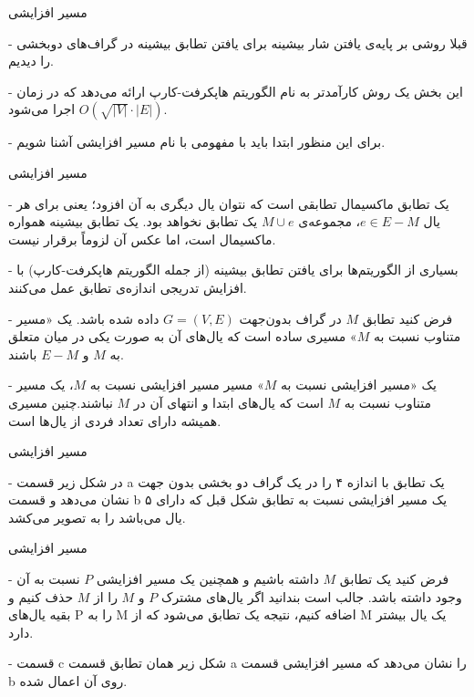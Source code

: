 \begin{itemframe}{مسیر افزایشی}
\item[-]
قبلا روشی بر پایه‌ی یافتن شار بیشینه برای یافتن تطابق بیشینه در گراف‌های دو‌بخشی را دیدیم.
\item[-]
این بخش یک روش کارآمدتر به نام الگوریتم هاپکرفت-کارپ
 ارائه می‌دهد که در زمان
 $O(\sqrt{|V|} \cdot |E|)$
 اجرا می‌شود.
\item[-]
برای این منظور ابتدا باید با مفهومی با نام مسیر افزایشی آشنا شویم.
\end{itemframe}


\begin{itemframe}{مسیر افزایشی}
\item[-]
یک تطابق ماکسیمال
 تطابقی است که نتوان یال دیگری به آن افزود؛ یعنی برای هر یال $e \in E - M$، مجموعه‌ی $M \cup {e}$ یک تطابق نخواهد بود. یک تطابق بیشینه همواره ماکسیمال است، اما عکس آن لزوماً برقرار نیست.

\item[-]
بسیاری از الگوریتم‌ها برای یافتن تطابق بیشینه (از جمله الگوریتم هاپکرفت-کارپ) با افزایش تدریجی اندازه‌ی تطابق عمل می‌کنند.
\item[-]
فرض کنید تطابق $M$ در گراف بدون‌جهت $G = (V, E)$ داده شده باشد. یک «مسیر متناوب نسبت به $M$»
مسیری ساده است که یال‌های آن به صورت یکی در میان متعلق به $M$ و $E - M$ باشند.
\item[-]
یک «مسیر افزایشی نسبت به $M$»
مسیر مسیر افزایشی نسبت به $M$، یک مسیر متناوب نسبت به $M$ است که یال‌های ابتدا و انتهای آن در $M$ نباشند.چنین مسیری همیشه دارای تعداد فردی از یال‌ها است.
\end{itemframe}


\begin{itemframe}{مسیر افزایشی}
\item[-]
در شکل زیر قسمت a یک تطابق با اندازه ۴ را در یک گراف دو بخشی بدون جهت نشان می‌دهد و قسمت b یک مسیر افزایشی نسبت به تطابق شکل قبل که دارای ۵ یال می‌باشد را به تصویر می‌کشد.

\end{itemframe}


\begin{itemframe}{مسیر افزایشی}
\decLineSpace[1mm]
\item[-]
فرض کنید یک تطابق $M$ داشته باشیم و همچنین یک مسیر افزایشی $P$ نسبت به آن وجود داشته باشد. جالب است بندانید اگر یال‌های مشترک $P$ و $M$ را از $M$ حذف کنیم و بقیه یال‌های P را به M اضافه کنیم، نتیجه یک تطابق می‌شود که از M یک یال بیشتر دارد.
\item[-]
قسمت c شکل زیر همان تطابق قسمت a را نشان می‌دهد که مسیر افزایشی قسمت b روی آن اعمال شده.

\end{itemframe}


